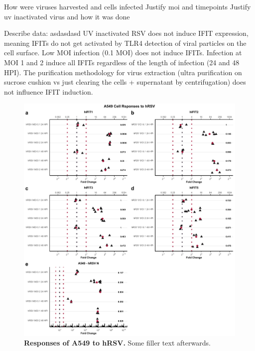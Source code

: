 How were viruses harvested and cells infected \newline
Justify moi and timepoints \newline
Justify uv inactivated virus and how it was done \newline

Describe data: \newline
asdasdasd \newline
UV inactivated RSV does not induce IFIT expression, meaning IFITs do not get activated by TLR4 detection of viral particles on the cell surface. Low MOI infection (0.1 MOI) does not induce IFITs. Infection at MOI 1 and 2 induce all IFITs regardless of the length of infection (24 and 48 HPI). The purification methodology for virus extraction (ultra purification on sucrose cushion vs just clearing the cells + supernatant by centrifugation) does not influence IFIT induction.

\begin{figure}
    \centering
    \includegraphics[width=1\linewidth]{06. Chapter 1/Figs/01. Induction/05. a549_hrsv_timepoints.pdf}
    \caption[Responses of A549 to hRSV.]{\textbf{Responses of A549 to hRSV.} Some filler text afterwards.}
    \label{Responses of A549 to hRSV}
\end{figure}

